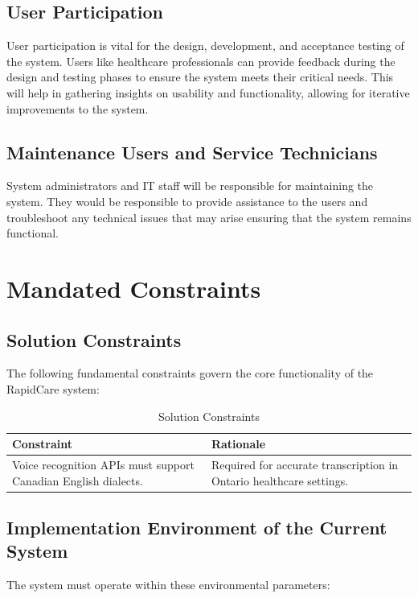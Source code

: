 \documentclass[12pt]{article}
\begin{document}
\subsection{User Participation}
User participation is vital for the design, development, and acceptance testing of the system. Users like healthcare professionals can provide feedback during the design and testing phases to ensure the system meets their critical needs. This will help in gathering insights on usability and functionality, allowing for iterative improvements to the system.

\subsection{Maintenance Users and Service Technicians}
System administrators and IT staff will be responsible for maintaining the system. They would be responsible to provide assistance to the users and troubleshoot any technical issues that may arise ensuring that the system remains functional. 

\section{Mandated Constraints}

\subsection{Solution Constraints}
The following fundamental constraints govern the core functionality of the RapidCare system:

\begin{table}[H]
\centering
\begin{tabular}{|p{6cm}|p{6cm}|}
\hline
\textbf{Constraint} & \textbf{Rationale} \\
\hline
Voice recognition APIs must support Canadian English dialects. & Required for accurate transcription in Ontario healthcare settings. \\
\hline
\end{tabular}
\caption{Solution Constraints}
\label{tab:solution_constraints}
\end{table}

\subsection{Implementation Environment of the Current System}
The system must operate within these environmental parameters:
\end{document}
